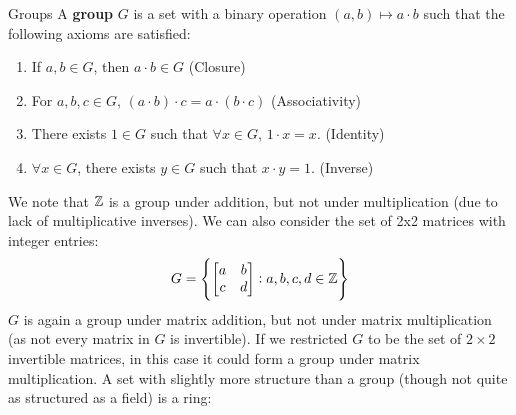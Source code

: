 \begin{ndef}{Groups}
A \textbf{group} $G$ is a set with a binary operation $(a,b) \mapsto a\cdot b$ such that the following axioms are satisfied:
\begin{enumerate}[start=1, label={(M\arabic*):}]
    \item If $a, b \in G$, then $a\cdot b \in G$ (Closure)
    \item For $a, b, c \in G$, $(a\cdot b)\cdot c = a\cdot(b\cdot c)$ (Associativity)
    \item There exists $1 \in G$ such that $\forall x \in G$, $1 \cdot x = x$. (Identity)
    \item $\forall x \in G$, there exists $y \in G$ such that $x \cdot y = 1$. (Inverse) 
\end{enumerate}
\end{ndef}
\noindent We note that $\mathbb{Z}$ is a group under addition, but not under multiplication (due to lack of multiplicative inverses). We can also consider the set of 2x2 matrices with integer entries:
\[G = \set{\begin{bmatrix} a & b \\ c & d \end{bmatrix}: a, b, c, d \in \mathbb{Z}}\]
$G$ is again a group under matrix addition, but not under matrix multiplication (as not every matrix in $G$ is invertible). If we restricted $G$ to be the set of $2\times 2$ invertible matrices, in this case it could form a group under matrix multiplication. A set with slightly more structure than a group (though not quite as structured as a field) is a ring:

